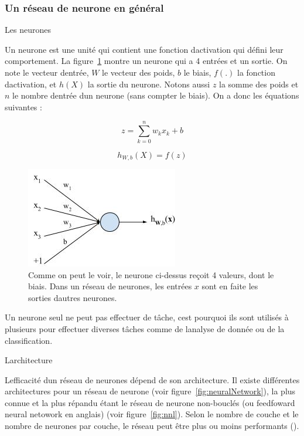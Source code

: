 \documentclass[11pt]{sdm}
\begin{document}
		\subsubsection{Un r\'eseau de neurone en g\'en\'eral}
			\begin{itshape}Les neurones\end{itshape}
			\smallbreak
			Un neurone est une unit\'e qui contient une fonction d\textquotesingle activation qui d\'efini leur comportement. La figure~\ref{fig:neural} montre un neurone qui a 4 entr\'ees et un sortie. On note  le vecteur d\textquotesingle entr\'ee, \textbf{$W$} le vecteur des poids, $b$ le biais, $f(.)$ la fonction d\textquotesingle activation, et $h(X)$ la sortie du neurone. Notons aussi $z$ la somme des poids et $n$ le nombre d\textquotesingle entr\'ee d\textquotesingle un neurone (sans compter le biais). On a donc les \'equations suivantes :
			
			\begin{equation}
				z = \sum_{k=0}^n w_k x_k + b
				\label{eq:z}
			\end{equation}

			\begin{equation}
				h_{W,b}(X) = f(z)
				\label{eq:h}
			\end{equation}

			\begin{figure}[!ht]
				\centering
				\includegraphics[scale=0.7,natwidth=251,natheight=166]{figures/neural.png}
				\caption{Comme on peut le voir, le neurone ci-dessus re\c coit 4 valeurs, dont le biais. Dans un r\'eseau de neurones, les entr\'ees $x$ sont en faite les sorties d\textquotesingle autres neurones.}
				\label{fig:neural}
			\end{figure}

			Un neurone seul ne peut pas effectuer de t\^ache, c\textquotesingle est pourquoi ils sont utilis\'es \`a plusieurs pour effectuer diverses t\^aches comme de l\textquotesingle analyse de donn\'ee ou de la classification.	

			\medbreak
			\begin{itshape}L\textquotesingle architecture\end{itshape}
			\smallbreak
			L\textquotesingle efficacit\'e d\textquotesingle un r\'eseau de neurones d\'epend de son architecture.
			Il existe diff\'erentes architectures pour un r\'eseau de neurone (voir figure~\ref{fig:neuralNetwork}), la plus connue et la plus r\'epandu \'etant le r\'eseau de neurone non-boucl\'es (ou feedfoward neural netowork en anglais) (voir figure~\ref{fig:nnl}). Selon le nombre de couche et le nombre de neurones par couche, le r\'eseau peut \^etre plus ou moins performants (\cite{chatfield2014return}\cite{srivastava2014dropout}). 
			
\end{document}
